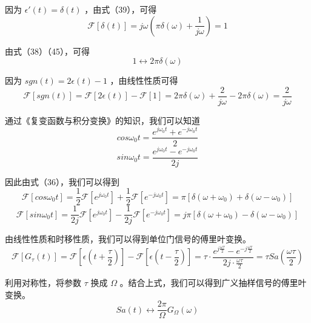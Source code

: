 \documentclass[UTF8,a4paper,11pt]{article}
\begin{document}
因为 $\epsilon'(t)=\delta(t)$ ，由式（39），可得
\begin{equation}
\mathscr{F}[\delta(t)]=j\omega(\pi\delta(\omega)+\frac{1}{j\omega})=1
\end{equation}

由式（38）（45），可得
\begin{equation}
1\leftrightarrow 2\pi\delta(\omega)
\end{equation}

因为 $sgn(t)=2\epsilon(t)-1$ ，由线性性质可得
\begin{equation}
\mathscr{F}[sgn(t)]=\mathscr{F}[2\epsilon(t)]-\mathscr{F}[1]=2\pi\delta(\omega)+\frac{2}{j\omega}-2\pi\delta(\omega)=\frac{2}{j\omega}
\end{equation}

通过《复变函数与积分变换》的知识，我们可以知道
\begin{equation}
cos\omega_0t=\frac{e^{j\omega_0 t}+e^{-j\omega_0 t}}{2}
\end{equation}
\begin{equation}
sin\omega_0t=\frac{e^{j\omega_0 t}-e^{-j\omega_0 t}}{2j}
\end{equation}

因此由式（36），我们可以得到
\begin{equation}
\mathscr{F}[cos\omega_0t]=\frac{1}{2}\mathscr{F}[e^{j\omega_0 t}]+\frac{1}{2}\mathscr{F}[e^{-j\omega_0 t}]=\pi[\delta(\omega+\omega_0)+\delta(\omega-\omega_0)]
\end{equation}
\begin{equation}
\mathscr{F}[sin\omega_0t]=\frac{1}{2j}\mathscr{F}[e^{j\omega_0 t}]-\frac{1}{2j}\mathscr{F}[e^{-j\omega_0 t}]=j\pi[\delta(\omega+\omega_0)-\delta(\omega-\omega_0)]
\end{equation}

由线性性质和时移性质，我们可以得到单位门信号的傅里叶变换。
\begin{equation}
\mathscr{F}[G_{\tau}(t)]=\mathscr{F}[\epsilon(t+\frac{\tau}{2})]-\mathscr{F}[\epsilon(t-\frac{\tau}{2})]=\tau\cdot\frac{e^{j\frac{\omega\tau}{2}}-e^{-j\frac{\omega\tau}{2}}}{2j\cdot\frac{\omega\tau}{2}}=\tau Sa(\frac{\omega\tau}{2})
\end{equation}

利用对称性，将参数 $\tau$ 换成 $\Omega$ 。结合上式，我们可以得到广义抽样信号的傅里叶变换。
\begin{equation}
Sa(t)\leftrightarrow \frac{2\pi}{\Omega}G_{\Omega}(\omega)
\end{equation}
\end{document}
